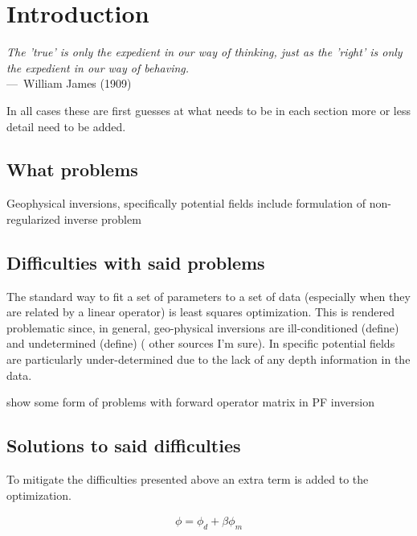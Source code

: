 
\chapter{Introduction}
\label{ch:Introduction}

\begin{epigraph}
\emph{The 'true' is only the expedient in our way of thinking, just as the 'right' is only the expedient in our way of behaving.}\\
---~William James (1909)
\end{epigraph}


In all cases these are first guesses at what needs to be in each section more or less detail need to be added.


\section{What problems}
\label{sec:What problems}

Geophysical inversions, specifically potential fields 
include formulation of non-regularized inverse problem

\section{Difficulties with said problems }
\label{sec:Difficulties with said problems }

The standard way to fit a set of parameters to a set of data (especially when they are related by a linear operator) is least squares optimization. This is rendered problematic since, in general, geo-physical inversions are ill-conditioned (define) and undetermined (define) (\cite{oldenburg2005inversion} other sources I'm sure). In specific potential fields are particularly under-determined due to the lack of any depth information in the data.

show some form of problems with forward operator matrix in PF inversion

\section{Solutions to said difficulties}
\label{sec:Solutions to said difficulties}

To mitigate the difficulties presented above an extra term is added to the optimization. 

\begin{align}
\phi = \phi_d + \beta\phi_m
\end{align}
\label{eq:objective function}

